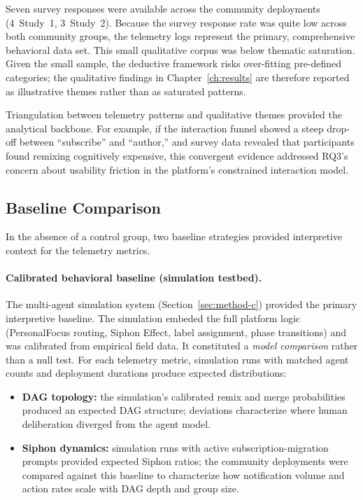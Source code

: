 \documentclass[a4paper, 12pt, twoside]{iviathesis}
\begin{document}
Seven survey responses were available across the community deployments (4~Study~1, 3~Study~2). Because the survey response rate was quite low across both community groups, the telemetry logs represent the primary, comprehensive behavioral data set. This small qualitative corpus was below thematic saturation. Given the small sample, the deductive framework risks over-fitting pre-defined categories; the qualitative findings in Chapter~\ref{ch:results} are therefore reported as illustrative themes rather than as saturated patterns.

Triangulation between telemetry patterns and qualitative themes provided the analytical backbone. For example, if the interaction funnel showed a steep drop-off between ``subscribe'' and ``author,'' and survey data revealed that participants found remixing cognitively expensive, this convergent evidence addressed RQ3's concern about usability friction in the platform's constrained interaction model.

\subsection{Baseline Comparison}
\label{sec:baseline-comparison}
In the absence of a control group, two baseline strategies provided interpretive context for the telemetry metrics.

\paragraph{Calibrated behavioral baseline (simulation testbed).}
The multi-agent simulation system (Section~\ref{sec:method-c}) provided the primary interpretive baseline. The simulation embeded the full platform logic (PersonalFocus routing, Siphon Effect, label assignment, phase transitions) and was calibrated from empirical field data. It constituted a \textit{model comparison} rather than a null test. For each telemetry metric, simulation runs with matched agent counts and deployment durations produce expected distributions:
\begin{itemize}
    \item \textbf{DAG topology:} the simulation's calibrated remix and merge probabilities produced an expected DAG structure; deviations characterize where human deliberation diverged from the agent model.
    \item \textbf{Siphon dynamics:} simulation runs with active subscription-migration prompts provided expected Siphon ratios; the community deployments were compared against this baseline to characterize how notification volume and action rates scale with DAG depth and group size.
\end{itemize}
\end{document}
